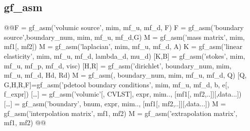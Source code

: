 \subsection{gf\_asm}
\begin{synopsis}
@@\tvec F = gf\_asm('volumic source', \tmim mim, \tmf mf\_u, \tmf mf\_d, \tvec F)
\tvec F = gf\_asm('boundary source',\tint boundary\_num, \tmim mim, \tmf mf\_u, \tmf mf\_d,\tvec G)
\tspmat M = gf\_asm('mass matrix', \tmim mim, \tmf mf1[, \tmf mf2])
\tspmat M = gf\_asm('laplacian', \tmim mim, \tmf mf\_u, \tmf mf\_d, \tvec A)
\tspmat K = gf\_asm('linear elasticity', \tmim mim, \tmf mf\_u, \tmf mf\_d, \tvec lambda\_d, \tvec mu\_d)
[\tspmat K,B] = gf\_asm('stokes', \tmim mim, \tmf mf\_u, \tmf mf\_p, \tmf mf\_d, \tvec visc)
[\tspmat H,\tvec R] = gf\_asm('dirichlet', \tint boundary\_num, \tmim mim, \tmf mf\_u, 
\tmf mf\_d, \tmat Hd, \tvec Rd)
M = gf\_asm(, \tint boundary\_num, \tmim mim, \tmf mf\_u, \tmf mf\_d, \tmat Q)
[\tspmat Q, \tvec G,\tspmat H,\tvec R,\tvec F]=gf\_asm('pdetool boundary conditions',
\tmim mim, \tmf mf\_u, \tmf mf\_d, \tmat b, \tmat e[, \tstr f\_expr])
[\ldots] = gf_asm('volumic'[, CVLST], \tstr expr, \tmim mim.., [\tmf mf1[, mf2,..]][,\tmat data...])
[\ldots] = gf_asm('boundary', \tint bnum, \tstr expr, \tmim mim.., [\tmf mf1[, mf2,..]][,\tmat data...])
M = gf_asm('interpolation matrix', \tmf mf1, \tmf mf2)
M = gf_asm('extrapolation matrix', \tmf mf1, \tmf mf2)
@@\end{synopsis}
